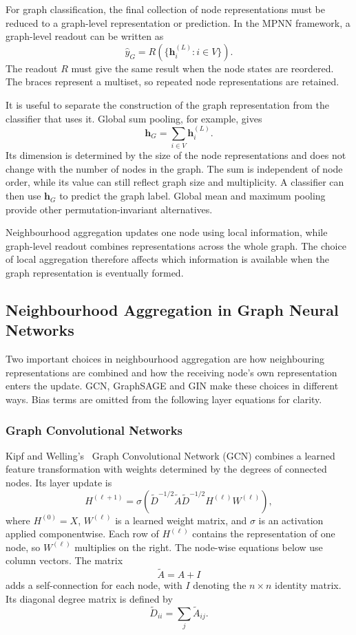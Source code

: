 \documentclass[11pt,a4paper]{article}
\begin{document}
For graph classification, the final collection of node representations must be reduced to a graph-level representation or prediction. In the MPNN framework, a graph-level readout can be written as
\[
\widehat{y}_G
=
R\!\left(
\{\mathbf{h}_i^{(L)}:i\in V\}
\right).
\]
The readout \(R\) must give the same result when the node states are reordered. The braces represent a multiset, so repeated node representations are retained.

It is useful to separate the construction of the graph representation from the classifier that uses it. Global sum pooling, for example, gives
\[
\mathbf{h}_G
=
\sum_{i\in V}\mathbf{h}_i^{(L)}.
\]
Its dimension is determined by the size of the node representations and does not change with the number of nodes in the graph. The sum is independent of node order, while its value can still reflect graph size and multiplicity. A classifier can then use \(\mathbf{h}_G\) to predict the graph label. Global mean and maximum pooling provide other permutation-invariant alternatives.

Neighbourhood aggregation updates one node using local information, while graph-level readout combines representations across the whole graph. The choice of local aggregation therefore affects which information is available when the graph representation is eventually formed.

\subsection{Neighbourhood Aggregation in Graph Neural Networks}
\label{sec:aggregation}

Two important choices in neighbourhood aggregation are how neighbouring representations are combined and how the receiving node's own representation enters the update. GCN, GraphSAGE and GIN make these choices in different ways. Bias terms are omitted from the following layer equations for clarity.

\subsubsection{Graph Convolutional Networks}
\label{sec:gcn}

Kipf and Welling's~\cite{kipf2017gcn} Graph Convolutional Network (GCN) combines a learned feature transformation with weights determined by the degrees of connected nodes. Its layer update is
\begin{equation}
H^{(\ell+1)}
=
\sigma\!\left(
\widetilde{D}^{-1/2}
\widetilde{A}
\widetilde{D}^{-1/2}
H^{(\ell)}
W^{(\ell)}
\right),
\label{eq:gcn}
\end{equation}
where \(H^{(0)}=X\), \(W^{(\ell)}\) is a learned weight matrix, and \(\sigma\) is an activation applied componentwise. Each row of \(H^{(\ell)}\) contains the representation of one node, so \(W^{(\ell)}\) multiplies on the right. The node-wise equations below use column vectors. The matrix
\[
\widetilde{A}=A+I
\]
adds a self-connection for each node, with \(I\) denoting the \(n\times n\) identity matrix. Its diagonal degree matrix is defined by
\[
\widetilde{D}_{ii}
=
\sum_j\widetilde{A}_{ij}.
\]
\end{document}
